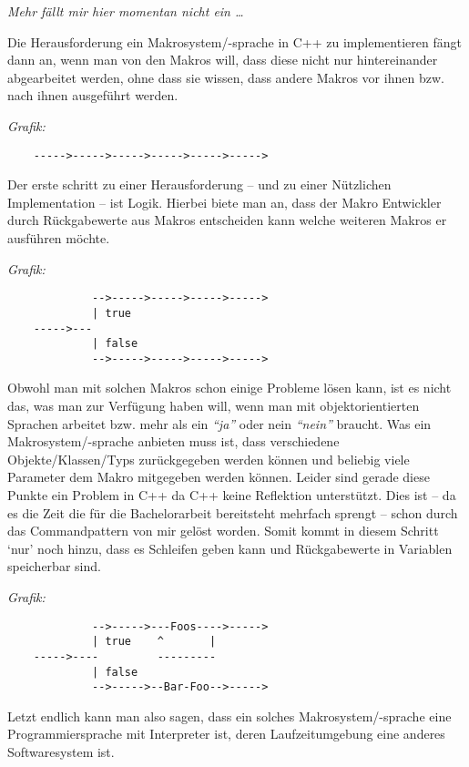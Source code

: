   \textit{%
    \color{DarkSlateGray}%
    Mehr fällt mir hier momentan nicht ein \ldots
  }

  Die Herausforderung ein Makrosystem/-sprache in C++ zu implementieren fängt dann an, wenn man von den Makros will, dass diese nicht nur hintereinander abgearbeitet werden, ohne dass sie wissen, dass andere Makros vor ihnen bzw. nach ihnen ausgeführt werden.

  \textit{%
    \color{DarkSlateGray}%
    Grafik:
  }
  \begin{verbatim}
    ----->----->----->----->----->----->
  \end{verbatim}

  Der erste schritt zu einer Herausforderung -- und zu einer Nützlichen Implementation -- ist Logik. Hierbei biete man an, dass der Makro Entwickler durch Rückgabewerte aus Makros entscheiden kann welche weiteren Makros er ausführen möchte.

  \textit{%
    \color{DarkSlateGray}%
    Grafik:
  }
  \begin{verbatim}
             -->----->----->----->----->
             | true
    ----->---
             | false
             -->----->----->----->----->
  \end{verbatim}

  Obwohl man mit solchen Makros schon einige Probleme lösen kann, ist es nicht das, was man zur Verfügung haben will, wenn man mit objektorientierten Sprachen arbeitet bzw. mehr als ein \textit{``ja''} oder nein \textit{``nein''} braucht. Was ein Makrosystem/-sprache anbieten muss ist, dass verschiedene Objekte/Klassen/Typs zurückgegeben werden können und beliebig viele Parameter dem Makro mitgegeben werden können. Leider sind gerade diese Punkte ein Problem in C++ da C++ keine Reflektion unterstützt. Dies ist -- da es die Zeit die für die Bachelorarbeit bereitsteht mehrfach sprengt -- schon durch das Commandpattern von mir gelöst worden. Somit kommt in diesem Schritt `nur' noch hinzu, dass es Schleifen geben kann und Rückgabewerte in Variablen speicherbar sind.

  \textit{%
    \color{DarkSlateGray}%
    Grafik:
  }
  \begin{verbatim}
             -->----->---Foos---->----->
             | true    ^       |
    ----->----         ---------
             | false
             -->----->--Bar-Foo-->----->
  \end{verbatim}

  Letzt endlich kann man also sagen, dass ein solches Makrosystem/-sprache eine Programmiersprache mit Interpreter ist, deren Laufzeitumgebung eine anderes Softwaresystem ist.


